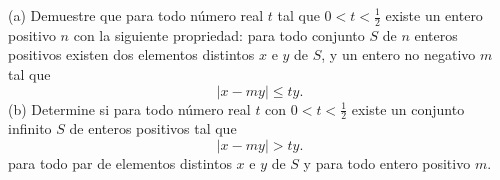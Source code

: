 (a) Demuestre que para todo número real $t$ tal que $0 \lt t \lt \frac12$
 existe un entero positivo $n$ con la
siguiente propriedad: para todo conjunto $S$ de $n$ enteros positivos existen dos elementos distintos
$x$ e $y$ de $S$, y un entero no negativo $m$ tal que
\[\left|x - my\right| \leq ty.\]
(b) Determine si para todo número real $t$ con $0 \lt t \lt \frac12$
 existe un conjunto infinito $S$ de enteros
positivos tal que
\[\left|x - my\right| \gt ty.\]
para todo par de elementos distintos $x$ e $y$ de $S$ y para todo entero positivo $m$.